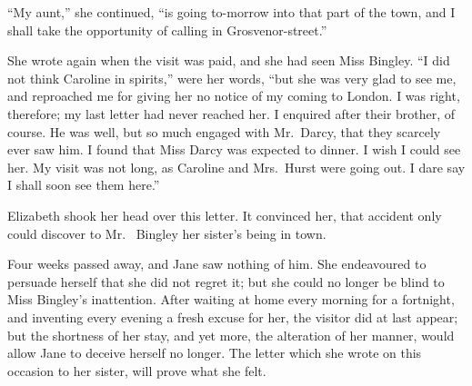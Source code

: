 “My aunt,” she continued, “is going to-morrow into
that part of the town, and I shall take the opportunity
of calling in Grosvenor-street.”

She wrote again when the visit was paid, and she had
seen Miss Bingley. “I did not think Caroline in spirits,”
were her words, “but she was very glad to see me, and
reproached me for giving her no notice of my coming to
London. I was right, therefore; my last letter had never
reached her. I enquired after their brother, of course.
He was well, but so much engaged with Mr.\ Darcy, that
they scarcely ever saw him. I found that Miss Darcy
was expected to dinner. I wish I could see her. My
visit was not long, as Caroline and Mrs.\ Hurst were going
out. I dare say I shall soon see them here.”

Elizabeth shook her head over this letter. It convinced
her, that accident only could discover to Mr.\ %
Bingley her sister’s being in town.

Four weeks passed away, and Jane saw nothing of him.
She endeavoured to persuade herself that she did not
regret it; but she could no longer be blind to Miss Bingley’s
inattention. After waiting at home every morning for
a fortnight, and inventing every evening a fresh excuse
for her, the visitor did at last appear; but the shortness
of her stay, and yet more, the alteration of her manner,
would allow Jane to deceive herself no longer. The letter
which she wrote on this occasion to her sister, will prove
what she felt.

